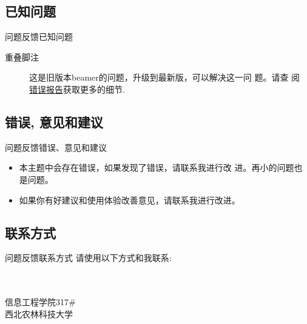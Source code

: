 \subsection{已知问题}
\begin{frame}{问题反馈}{已知问题}
  \begin{description}
  \item[重叠脚注] 这是旧版本beamer的问题，升级到最新版，可以解决这一问
    题。请查
    阅
    \href{https://bitbucket.org/rivanvx/beamer/issue/200/width-of-footnote-in-a-sidebar-theme}{
      错误报告}获取更多的细节.
  \end{description}
\end{frame}

\subsection{错误, 意见和建议}
\begin{frame}{问题反馈}{错误、意见和建议}
  \begin{itemize}
  \item<1-> 本主题中会存在错误，如果发现了错误，请联系我进行改
    进。\alert{再小的问题也是问题}。
  \item<2-> 如果你有好建议和使用体验改善意见，请联系我进行改进。
  \end{itemize}
\end{frame}

\subsection{联系方式}
\begin{frame}{问题反馈}{联系方式}
  请使用以下方式和我联系:
  \begin{center}
    \insertauthor\\
    \href{mailto:nangeng@qq.com}\\
    信息工程学院317\#\\
    西北农林科技大学
  \end{center}
\end{frame}



